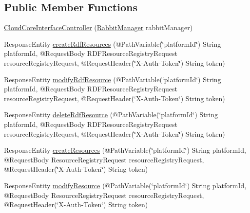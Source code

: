 \subsection*{Public Member Functions}
\begin{DoxyCompactItemize}
\item 
\hyperlink{classeu_1_1h2020_1_1symbiote_1_1controllers_1_1CloudCoreInterfaceController_a19222abf4496aac62c037451b02c7f31}{Cloud\+Core\+Interface\+Controller} (\hyperlink{classeu_1_1h2020_1_1symbiote_1_1communication_1_1RabbitManager}{Rabbit\+Manager} rabbit\+Manager)
\item 
Response\+Entity \hyperlink{classeu_1_1h2020_1_1symbiote_1_1controllers_1_1CloudCoreInterfaceController_aba49d96dd88fb9c2e40da1ef1407f920}{create\+Rdf\+Resources} (@Path\+Variable(\char`\"{}platform\+Id\char`\"{}) String platform\+Id, @Request\+Body R\+D\+F\+Resource\+Registry\+Request resource\+Registry\+Request, @Request\+Header(\char`\"{}X-\/Auth-\/Token\char`\"{}) String token)
\item 
Response\+Entity \hyperlink{classeu_1_1h2020_1_1symbiote_1_1controllers_1_1CloudCoreInterfaceController_af8d970421dd69d43d60e7602c4f3ed80}{modify\+Rdf\+Resource} (@Path\+Variable(\char`\"{}platform\+Id\char`\"{}) String platform\+Id, @Request\+Body R\+D\+F\+Resource\+Registry\+Request resource\+Registry\+Request, @Request\+Header(\char`\"{}X-\/Auth-\/Token\char`\"{}) String token)
\item 
Response\+Entity \hyperlink{classeu_1_1h2020_1_1symbiote_1_1controllers_1_1CloudCoreInterfaceController_a9c62416d477a419fb5d6d2aaa889d82c}{delete\+Rdf\+Resource} (@Path\+Variable(\char`\"{}platform\+Id\char`\"{}) String platform\+Id, @Request\+Body R\+D\+F\+Resource\+Registry\+Request resource\+Registry\+Request, @Request\+Header(\char`\"{}X-\/Auth-\/Token\char`\"{}) String token)
\item 
Response\+Entity \hyperlink{classeu_1_1h2020_1_1symbiote_1_1controllers_1_1CloudCoreInterfaceController_a527769559b5bc2a449750c911ecb1e5b}{create\+Resources} (@Path\+Variable(\char`\"{}platform\+Id\char`\"{}) String platform\+Id, @Request\+Body Resource\+Registry\+Request resource\+Registry\+Request, @Request\+Header(\char`\"{}X-\/Auth-\/Token\char`\"{}) String token)
\item 
Response\+Entity \hyperlink{classeu_1_1h2020_1_1symbiote_1_1controllers_1_1CloudCoreInterfaceController_a3121fdaec90f37631f561e62e118e763}{modify\+Resource} (@Path\+Variable(\char`\"{}platform\+Id\char`\"{}) String platform\+Id, @Request\+Body Resource\+Registry\+Request resource\+Registry\+Request, @Request\+Header(\char`\"{}X-\/Auth-\/Token\char`\"{}) String token)

\end{DoxyCompactItemize}
